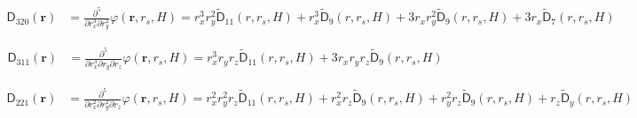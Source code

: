 \begin{align}
  \mathsf{D}_{320}(\mathbf{r}) &= \frac{\partial^5}{\partial r_x^3
    \partial r_y^2} \varphi (\mathbf{r}, r_s, H) =
  r_x^3 r_y^2 \mathsf{\tilde{D}}_{11}(r, r_s, H) +
  r_x^3 \mathsf{\tilde{D}}_{9}(r, r_s, H) +
  3 r_x r_y^2 \mathsf{\tilde{D}}_{9}(r, r_s, H) + 
  3 r_x \mathsf{\tilde{D}}_{7}(r, r_s, H)
  \nonumber
\end{align}

\begin{align}
  \mathsf{D}_{311}(\mathbf{r}) &= \frac{\partial^5}{\partial r_x^3
    \partial r_y \partial r_z} \varphi (\mathbf{r}, r_s, H) =
  r_x^3 r_y r_z \mathsf{\tilde{D}}_{11}(r, r_s, H) +
  3 r_x r_y r_z \mathsf{\tilde{D}}_{9}(r, r_s, H)
  \nonumber
\end{align}

\begin{align}
  \mathsf{D}_{221}(\mathbf{r}) &= \frac{\partial^5}{\partial r_x^2
    \partial r_y^2 \partial r_z} \varphi (\mathbf{r}, r_s, H) =
  r_x^2 r_y^2 r_z \mathsf{\tilde{D}}_{11}(r, r_s, H) +
  r_x^2 r_z \mathsf{\tilde{D}}_{9}(r, r_s, H) +
  r_y^2 r_z \mathsf{\tilde{D}}_{9}(r, r_s, H) +
  r_z \mathsf{\tilde{D}}_{y}(r, r_s, H)
  \nonumber
\end{align}





















